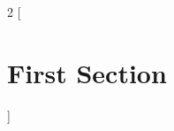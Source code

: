 \documentclass[12pt]{article}
\begin{document}


\begin{multicols}{2}
[\section{First Section}] %
\lipsum[1-8]
\end{multicols}

	
\end{document}
